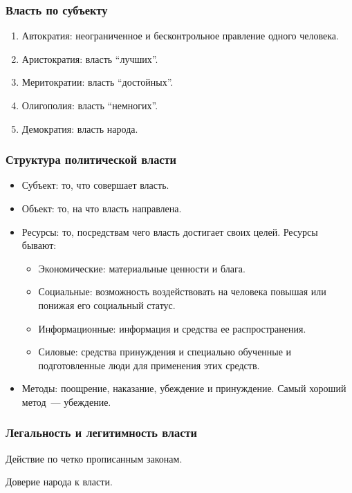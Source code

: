 \documentclass[12pt]{article}
\begin{document}
	\subsubsection{Власть по субъекту}
	\begin{enumerate}
		\item Автократия: неограниченное и бесконтрольное правление одного человека.
		\item Аристократия: власть ``лучших''.
		\item Меритократии: власть ``достойных''.
		\item Олигополия: власть ``немногих''.
		\item Демократия: власть народа.
	\end{enumerate}
	\subsubsection{Структура политической власти}
	\begin{itemize}
		\item Субъект: то, что совершает власть.
		\item Объект: то, на что власть направлена.
		\item Ресурсы: то, посредствам чего власть достигает своих целей. Ресурсы бывают:
		\begin{itemize}
			\item Экономические: материальные ценности и блага.
			\item Социальные: возможность воздействовать на человека повышая или понижая его социальный статус.
			\item Информационные: информация и средства ее распространения.
			\item Силовые: средства принуждения и специально обученные и подготовленные люди для применения этих средств.
		\end{itemize}
		\item Методы: поощрение, наказание, убеждение и принуждение. Самый хороший метод~--- убеждение.
	\end{itemize}
	\subsubsection{Легальность и легитимность власти}
	\begin{definition}[Легальность]
		Действие по четко прописанным законам.
	\end{definition}
	\begin{definition}[Легитимность]
		Доверие народа к власти.
	\end{definition}
\end{document}
